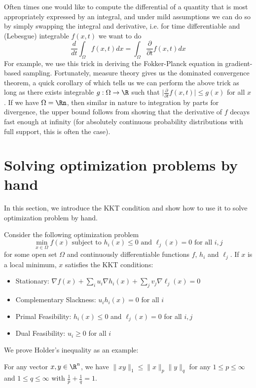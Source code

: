 Often times one would like to compute the differential of a quantity
that is most appropriately expressed by an integral, and under mild
assumptions we can do so by simply swapping the integral and derivative,
i.e. for time differentiable and (Lebesgue) integrable $f(x,t)$ we
want to do
\[
\frac{d}{dt}\int_{\Omega}f(x,t)dx=\int_{\Omega}\frac{\partial}{\partial t}f(x,t)dx
\]
For example, we use this trick in deriving the Fokker-Planck equation
in gradient-based sampling. Fortunately, measure theory gives us the
dominated convergence theorem, a quick corollary of which tells us
we can perform the above trick as long as there exists integrable
$g:\Omega\rightarrow\R$ such that $\big|\frac{\partial}{\partial t}f(x,t)\big|\leq g(x)$
for all $x$. If we have $\Omega=\Rn$, then similar in nature to
integration by parts for divergence, the upper bound follows from
showing that the derivative of $f$ decays fast enough at infinity
(for absolutely continuous probability distributions with full support,
this is often the case).

\section{Solving optimization problems by hand}

In this section, we introduce the KKT condition and show how to use
it to solve optimization problem by hand.
\begin{thm}
Consider the following optimization problem
\[
\min_{x\in\Omega}f(x)\text{ subject to }h_{i}(x)\leq0\text{ and }\ell_{j}(x)=0\text{ for all }i,j
\]
for some open set $\Omega$ and continuously differentiable functions
$f$, $h_{i}$ and $\ell_{j}$. If $x$ is a local minimum, $x$ satisfies
the KKT conditions:
\begin{itemize}
\item Stationary: $\nabla f(x)+\sum_{i}u_{i}\nabla h_{i}(x)+\sum_{j}v_{j}\nabla\ell_{j}(x)=0$
\item Complementary Slackness: $u_{i}h_{i}(x)=0$ for all $i$
\item Primal Feasibility: $h_{i}(x)\leq0$ and $\ell_{j}(x)=0$ for all
$i,j$
\item Dual Feasibility: $u_{i}\geq0$ for all $i$
\end{itemize}
We prove Holder's inequality as an example:
\end{thm}

\begin{fact}
For any vector $x,y\in\R^{n}$, we have $\|xy\|_{1}\leq\|x\|_{p}\|y\|_{q}$
for any $1\leq p\leq\infty$ and $1\leq q\leq\infty$ with $\frac{1}{p}+\frac{1}{q}=1$.
\end{fact}


